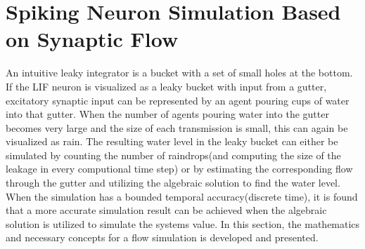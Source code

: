
\section{Spiking Neuron Simulation Based on Synaptic Flow}
	\label{secDevelopmentOfTheNovelANNmodel}
	An intuitive leaky integrator is a bucket with a set of small holes at the bottom.
	If the LIF neuron is visualized as a leaky bucket with input from a gutter, excitatory synaptic input can be represented by an agent pouring cups of water into that gutter.
	When the number of agents pouring water into the gutter becomes very large and the size of each transmission is small, this can again be visualized as rain.
	The resulting water level in the leaky bucket can either be simulated by counting the number of raindrops(and computing the size of the leakage in every computional time step)
		or by estimating the corresponding flow through the gutter and utilizing the algebraic solution to find the water level.
	When the simulation has a bounded temporal accuracy(discrete time), it is found that a more accurate simulation result can be achieved when the algebraic solution is utilized to simulate the systems value.
	In this section, the mathematics and necessary concepts for a flow simulation is developed and presented.




